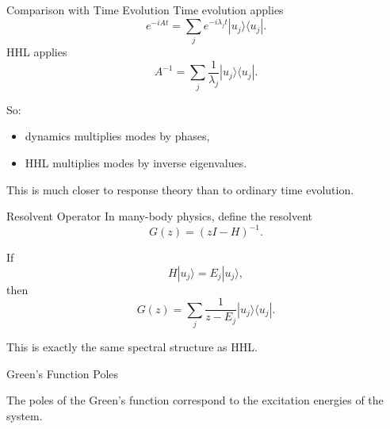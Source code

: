 \documentclass{beamer}
\begin{document}

\begin{frame}{Comparison with Time Evolution}
Time evolution applies
\[
e^{-iAt} = \sum_j e^{-i\lambda_j t}|u_j\rangle\langle u_j|.
\]
HHL applies
\[
A^{-1} = \sum_j \frac{1}{\lambda_j}|u_j\rangle\langle u_j|.
\]

So:
\begin{itemize}
\item dynamics multiplies modes by phases,
\item HHL multiplies modes by inverse eigenvalues.
\end{itemize}

This is much closer to response theory than to ordinary time evolution.
\end{frame}



\begin{frame}{Resolvent Operator}
In many-body physics, define the resolvent
\[
G(z) = (zI-H)^{-1}.
\]

If
\[
H|u_j\rangle = E_j |u_j\rangle,
\]
then
\[
G(z)=\sum_j \frac{1}{z-E_j}|u_j\rangle\langle u_j|.
\]

This is exactly the same spectral structure as HHL.
\end{frame}


\begin{frame}{Green's Function Poles}
\centering
{}

\vspace{0.3cm}
The poles of the Green's function correspond to the excitation energies of the system.
\end{frame}
\end{document}
